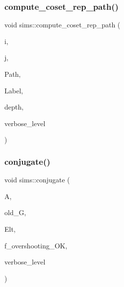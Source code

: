 \mbox{\label{classsims_a22a53a24eb86dcfe54cb3588776a4d96}} 
\subsubsection{\texorpdfstring{compute\+\_\+coset\+\_\+rep\+\_\+path()}{compute\_coset\_rep\_path()}}
{\footnotesize\ttfamily void sims\+::compute\+\_\+coset\+\_\+rep\+\_\+path (\begin{DoxyParamCaption}\item[{\mbox{\hyperlink{galois_8h_a09fddde158a3a20bd2dcadb609de11dc}{I\+NT}}}]{i,  }\item[{\mbox{\hyperlink{galois_8h_a09fddde158a3a20bd2dcadb609de11dc}{I\+NT}}}]{j,  }\item[{\mbox{\hyperlink{galois_8h_a09fddde158a3a20bd2dcadb609de11dc}{I\+NT}} $\ast$\&}]{Path,  }\item[{\mbox{\hyperlink{galois_8h_a09fddde158a3a20bd2dcadb609de11dc}{I\+NT}} $\ast$\&}]{Label,  }\item[{\mbox{\hyperlink{galois_8h_a09fddde158a3a20bd2dcadb609de11dc}{I\+NT}} \&}]{depth,  }\item[{\mbox{\hyperlink{galois_8h_a09fddde158a3a20bd2dcadb609de11dc}{I\+NT}}}]{verbose\+\_\+level }\end{DoxyParamCaption})}

\mbox{\label{classsims_ae5fdcadcb51929b4f5c02347384d8b8d}} 
\subsubsection{\texorpdfstring{conjugate()}{conjugate()}}
{\footnotesize\ttfamily void sims\+::conjugate (\begin{DoxyParamCaption}\item[{\mbox{\hyperlink{classaction}{action}} $\ast$}]{A,  }\item[{\mbox{\hyperlink{classsims}{sims}} $\ast$}]{old\+\_\+G,  }\item[{\mbox{\hyperlink{galois_8h_a09fddde158a3a20bd2dcadb609de11dc}{I\+NT}} $\ast$}]{Elt,  }\item[{\mbox{\hyperlink{galois_8h_a09fddde158a3a20bd2dcadb609de11dc}{I\+NT}}}]{f\+\_\+overshooting\+\_\+\+OK,  }\item[{\mbox{\hyperlink{galois_8h_a09fddde158a3a20bd2dcadb609de11dc}{I\+NT}}}]{verbose\+\_\+level }\end{DoxyParamCaption})}

